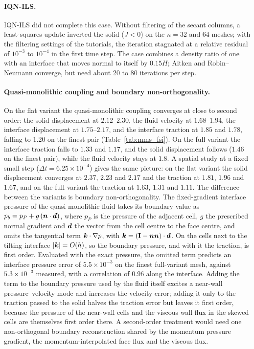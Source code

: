 \paragraph{IQN-ILS.}
IQN-ILS did not complete this case.
Without filtering of the secant columns, a least-squares update inverted the solid ($J < 0$) on the $n = 32$ and $64$ meshes; with the filtering settings of the tutorials, the iteration stagnated at a relative residual of $10^{-3}$ to $10^{-4}$ in the first time step.
The case combines a density ratio of one with an interface that moves normal to itself by $0.15H$; Aitken and Robin--Neumann converge, but need about 20 to 80 iterations per step.

\paragraph{Quasi-monolithic coupling and boundary non-orthogonality.}
On the flat variant the quasi-monolithic coupling converges at close to second order: the solid displacement at $2.12$--$2.30$, the fluid velocity at $1.68$--$1.94$, the interface displacement at $1.75$--$2.17$, and the interface traction at $1.85$ and $1.78$, falling to $1.20$ on the finest pair (Table~\ref{tab:mms_fsi}).
On the full variant the interface traction falls to $1.33$ and $1.17$, and the solid displacement follows ($1.46$ on the finest pair), while the fluid velocity stays at $1.8$.
A spatial study at a fixed small step ($\Delta t = 6.25\times10^{-4}$) gives the same picture: on the flat variant the solid displacement converges at $2.37$, $2.23$ and $2.17$ and the traction at $1.81$, $1.96$ and $1.67$, and on the full variant the traction at $1.63$, $1.31$ and $1.11$.
The difference between the variants is boundary non-orthogonality.
The fixed-gradient interface pressure of the quasi-monolithic fluid takes its boundary value as $p_b = p_P + g\,(\boldsymbol{n}\cdot\boldsymbol{d})$, where $p_P$ is the pressure of the adjacent cell, $g$ the prescribed normal gradient and $\boldsymbol{d}$ the vector from the cell centre to the face centre, and omits the tangential term $\boldsymbol{k}\cdot\nabla p$, with $\boldsymbol{k} = (\mathbf{I} - \boldsymbol{n}\boldsymbol{n})\cdot\boldsymbol{d}$.
On the cells next to the tilting interface $|\boldsymbol{k}| = O(h)$, so the boundary pressure, and with it the traction, is first order.
Evaluated with the exact pressure, the omitted term predicts an interface pressure error of $5.5\times10^{-3}$ on the finest full-variant mesh, against $5.3\times10^{-3}$ measured, with a correlation of $0.96$ along the interface.
Adding the term to the boundary pressure used by the fluid itself excites a near-wall pressure--velocity mode and increases the velocity error; adding it only to the traction passed to the solid halves the traction error but leaves it first order, because the pressure of the near-wall cells and the viscous wall flux in the skewed cells are themselves first order there.
A second-order treatment would need one non-orthogonal boundary reconstruction shared by the momentum pressure gradient, the momentum-interpolated face flux and the viscous flux.

